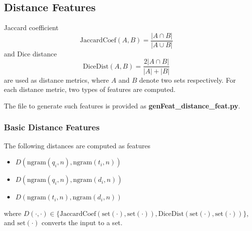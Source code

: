 \documentclass[12pt]{article}
\begin{document}
\subsection{Distance Features}
\label{subsec:Distance_Features}
Jaccard coefficient
\begin{equation}
\text{JaccardCoef}(A, B) = \frac{|A\cap{B}|}{|A\cup{B}|}
\end{equation}
and Dice distance
\begin{equation}
\text{DiceDist}(A, B) = \frac{2|A\cap{B}|}{|A|+|B|}
\end{equation}
are used as distance metrics, where $A$ and $B$ denote two sets respectively. For each distance metric, two types of features are computed.

The file to generate such features is provided as \textbf{genFeat\_distance\_feat.py}.
\subsubsection{Basic Distance Features}
The following distances are computed as features
\begin{itemize}
\item $D(\text{ngram}(q_i, n), \text{ngram}(t_i, n))$
\item $D(\text{ngram}(q_i, n), \text{ngram}(d_i, n))$
\item $D(\text{ngram}(t_i, n), \text{ngram}(d_i, n))$
\end{itemize}
where $D(\cdot, \cdot)\in\{\text{JaccardCoef}(\text{set}(\cdot), \text{set}(\cdot)), \text{DiceDist}(\text{set}(\cdot), \text{set}(\cdot))\}$, and $\text{set}(\cdot)$ converts the input to a set.
\end{document}
